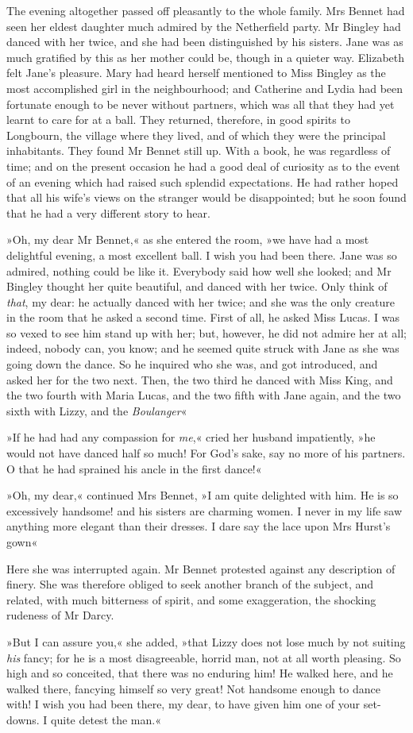 The evening altogether passed off pleasantly to the whole family. Mrs Bennet had seen her eldest daughter much admired by the Netherfield party. Mr Bingley had danced with her twice, and she had been distinguished by his sisters. Jane was as much gratified by this as her mother could be, though in a quieter way. Elizabeth felt Jane's pleasure. Mary had heard herself mentioned to Miss Bingley as the most accomplished girl in the neighbourhood; and Catherine and Lydia had been fortunate enough to be never without partners, which was all that they had yet learnt to care for at a ball. They returned, therefore, in good spirits to Longbourn, the village where they lived, and of which they were the principal inhabitants. They found Mr Bennet still up. With a book, he was regardless of time; and on the present occasion he had a good deal of curiosity as to the event of an evening which had raised such splendid expectations. He had rather hoped that all his wife's views on the stranger would be disappointed; but he soon found that he had a very different story to hear.

»Oh, my dear Mr Bennet,« as she entered the room, »we have had a most delightful evening, a most excellent ball. I wish you had been there. Jane was so admired, nothing could be like it. Everybody said how well she looked; and Mr Bingley thought her quite beautiful, and danced with her twice. Only think of \textit{that}, my dear: he actually danced with her twice; and she was the only creature in the room that he asked a second time. First of all, he asked Miss Lucas. I was so vexed to see him stand up with her; but, however, he did not admire her at all; indeed, nobody can, you know; and he seemed quite struck with Jane as she was going down the dance. So he inquired who she was, and got introduced, and asked her for the two next. Then, the two third he danced with Miss King, and the two fourth with Maria Lucas, and the two fifth with Jane again, and the two sixth with Lizzy, and the \textit{Boulanger}\longdash«

»If he had had any compassion for \textit{me},« cried her husband impatiently, »he would not have danced half so much! For God's sake, say no more of his partners. O that he had sprained his ancle in the first dance!«

»Oh, my dear,« continued Mrs Bennet, »I am quite delighted with him. He is so excessively handsome! and his sisters are charming women. I never in my life saw anything more elegant than their dresses. I dare say the lace upon Mrs Hurst's gown\longdash«

Here she was interrupted again. Mr Bennet protested against any description of finery. She was therefore obliged to seek another branch of the subject, and related, with much bitterness of spirit, and some exaggeration, the shocking rudeness of Mr Darcy.

»But I can assure you,« she added, »that Lizzy does not lose much by not suiting \textit{his} fancy; for he is a most disagreeable, horrid man, not at all worth pleasing. So high and so conceited, that there was no enduring him! He walked here, and he walked there, fancying himself so very great! Not handsome enough to dance with! I wish you had been there, my dear, to have given him one of your set-downs. I quite detest the man.«
